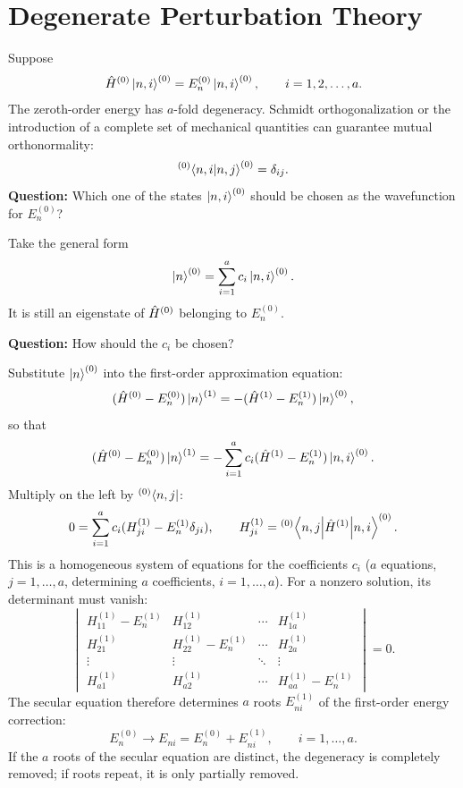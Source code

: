 \section{Degenerate Perturbation Theory}
Suppose
\begin{equation}
 \hat{H}^{(0)}\left|n,i\right\rangle^{(0)}=E_n^{(0)}\left|n,i\right\rangle^{(0)},
 \qquad i=1,2,\ldots,a.
\end{equation}
The zeroth-order energy has $a$-fold degeneracy. Schmidt orthogonalization or the introduction of a complete set of mechanical quantities can guarantee mutual orthonormality:
\begin{equation}
 {}^{(0)}\!\left\langle n,i\middle|n,j\right\rangle^{(0)}=\delta_{ij}.
\end{equation}
\textbf{Question:} Which one of the states $\left|n,i\right\rangle^{(0)}$ should be chosen as the wavefunction for $E_n^{(0)}$?

Take the general form
\begin{equation}
 \left|n\right\rangle^{(0)}=\sum_{i=1}^{a}c_i\left|n,i\right\rangle^{(0)}.
\end{equation}
It is still an eigenstate of $\hat{H}^{(0)}$ belonging to $E_n^{(0)}$.

\textbf{Question:} How should the $c_i$ be chosen?

Substitute $\left|n\right\rangle^{(0)}$ into the first-order approximation equation:
\begin{equation}
 (\hat{H}^{(0)}-E_n^{(0)})\left|n\right\rangle^{(1)}
 =-(\hat{H}^{(1)}-E_n^{(1)})\left|n\right\rangle^{(0)},
\end{equation}
so that
\begin{equation}
 (\hat{H}^{(0)}-E_n^{(0)})\left|n\right\rangle^{(1)}
 =-\sum_{i=1}^a c_i(\hat{H}^{(1)}-E_n^{(1)})\left|n,i\right\rangle^{(0)}.
\end{equation}
Multiply on the left by ${}^{(0)}\!\left\langle n,j\right|$:
\begin{equation}
 0=\sum_{i=1}^{a}c_i(H_{ji}^{(1)}-E_n^{(1)}\delta_{ji}),
 \qquad H_{ji}^{(1)}={}^{(0)}\!\left\langle n,j\middle|\hat{H}^{(1)}\middle|n,i\right\rangle^{(0)}.
\end{equation}
This is a homogeneous system of equations for the coefficients $c_i$ ($a$ equations, $j=1,\ldots,a$, determining $a$ coefficients, $i=1,\ldots,a$). For a nonzero solution, its determinant must vanish:
\begin{equation}
 \begin{vmatrix}
 H_{11}^{(1)}-E_n^{(1)}&H_{12}^{(1)}&\cdots&H_{1a}^{(1)}\\
 H_{21}^{(1)}&H_{22}^{(1)}-E_n^{(1)}&\cdots&H_{2a}^{(1)}\\
 \vdots&\vdots&\ddots&\vdots\\
 H_{a1}^{(1)}&H_{a2}^{(1)}&\cdots&H_{aa}^{(1)}-E_n^{(1)}
 \end{vmatrix}=0.
\end{equation}
The secular equation therefore determines $a$ roots $E_{ni}^{(1)}$ of the first-order energy correction:
\begin{equation}
 E_n^{(0)}\longrightarrow E_{ni}=E_n^{(0)}+E_{ni}^{(1)},
 \qquad i=1,\ldots,a.
\end{equation}
If the $a$ roots of the secular equation are distinct, the degeneracy is completely removed; if roots repeat, it is only partially removed.

